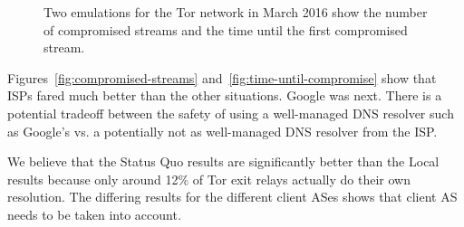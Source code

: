 \begin{figure}[t]
\centering
{}
\caption{Two emulations for the Tor network in March 2016 show the
  number of compromised streams and the time until the first compromised
  stream.} 
\label{fig:compromise-stream-time}
\end{figure}

Figures~\ref{fig:compromised-streams}
and~\ref{fig:time-until-compromise} show that
ISPs fared much better than the other situations. Google was next. There is a potential 
tradeoff between the safety of using a well-managed DNS resolver such as Google's vs. 
a potentially not as well-managed DNS resolver from the ISP.  

We believe that the Status Quo results are significantly better than the 
Local results because only around 12\% of Tor exit relays actually do their own resolution.
The differing results for the different client ASes shows that client AS needs to be 
taken into account. 


